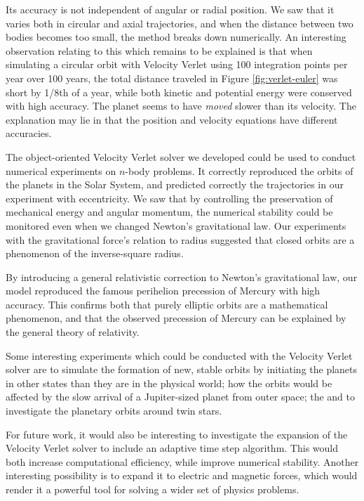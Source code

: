 \documentclass[]{article}
\begin{document}
Its accuracy is not independent of angular or radial position. We saw that it varies both in circular and axial trajectories, and when the distance between two bodies becomes too small, the method breaks down numerically. An interesting observation relating to this which remains to be explained is that when simulating a circular orbit with Velocity Verlet using 100 integration points per year over 100 years, the total distance traveled in Figure \ref{fig:verlet-euler} was short by 1/8th of a year, while both kinetic and potential energy were conserved with high accuracy. The planet seems to have \textit{moved} slower than its velocity. The explanation may lie in that the position and velocity equations have different accuracies.


The object-oriented Velocity Verlet solver we developed could be used to conduct numerical experiments on $n$-body problems. It correctly reproduced the orbits of the planets in the Solar System, and predicted correctly the trajectories in our experiment with eccentricity. We saw that by controlling the preservation of mechanical energy and angular momentum, the numerical stability could be monitored even when we changed Newton's gravitational law. Our experiments with the gravitational force's relation to radius suggested that closed orbits are a phenomenon of the inverse-square radius.

By introducing a general relativistic correction to Newton's gravitational law, our model reproduced the famous perihelion precession of Mercury with high accuracy. This confirms both that purely elliptic orbits are a mathematical phenomenon, and that the observed precession of Mercury can be explained by the general theory of relativity.

Some interesting experiments which could be conducted with the Velocity Verlet solver are to simulate the formation of new, stable orbits by initiating the planets in other states than they are in the physical world; how the orbits would be affected by the slow arrival of a Jupiter-sized planet from outer space; the and to investigate the planetary orbits around twin stars.

For future work, it would also be interesting to investigate the expansion of the Velocity Verlet solver to include an adaptive time step algorithm. This would both increase computational efficiency, while improve numerical stability. Another interesting possibility is to expand it to electric and magnetic forces, which would render it a powerful tool for solving a wider set of physics problems. 


\clearpage


\end{document}
